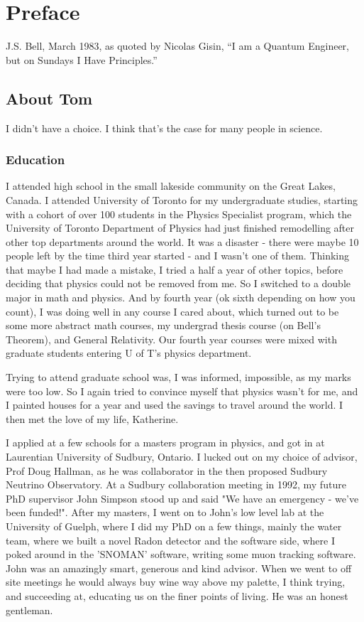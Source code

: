 \documentclass[../rzero]{subfiles}
\begin{document}
\chapter{Preface}

\begin{chapquote}{J.S. Bell, March 1983, as quoted by Nicolas Gisin, \textit{\cite{bertlmannQuantumUnspeakablesBell2002}}}
``I am a Quantum Engineer, but on Sundays I Have Principles.''
\end{chapquote}

\section*{About Tom}
I didn't have a choice. I think that's the case for many people in science. 

\subsection*{Education}
I attended high school in the small lakeside community on the Great Lakes, Canada. I attended University of Toronto for my undergraduate studies, starting with a cohort of over 100 students in the Physics Specialist program, which the University of Toronto Department of Physics had just finished remodelling after other top departments around the world. It was a disaster - there were maybe 10 people left by the time third year started - and I wasn't one of them. Thinking that maybe I had made a mistake, I tried a half a year of other topics, before deciding that physics could not be removed from me. So I switched to a double major in math and physics. And by fourth year (ok sixth depending on how you count), I was doing well in any course I cared about, which turned out to be some more abstract math courses, my undergrad thesis course (on Bell's Theorem), and General Relativity. Our fourth year courses were mixed with graduate students entering U of T's physics department. 

Trying to attend graduate school was, I was informed, impossible, as my marks were too low. So I again tried to convince myself that physics wasn't for me, and I painted houses for a year and used the savings to travel around the world. I then met the love of my life, Katherine. 

I applied at a few schools for a masters program in physics, and got in at Laurentian University of Sudbury, Ontario. I lucked out on my choice of advisor, Prof Doug Hallman, as he was collaborator in the then proposed Sudbury Neutrino Observatory. At a Sudbury collaboration meeting in 1992, my future PhD supervisor John Simpson stood up and said "We have an emergency - we've been funded!". After my masters, I went on to John's low level lab at the University of Guelph, where I did my PhD on a few things, mainly the water team, where we built a novel Radon detector and the software side, where I poked around in the 'SNOMAN' software, writing some muon tracking software. John was an amazingly smart, generous and kind advisor. When we went to off site meetings he would always buy wine way above my palette, I think trying, and succeeding at, educating us on the finer points of living. He was an honest gentleman. 
\end{document}
